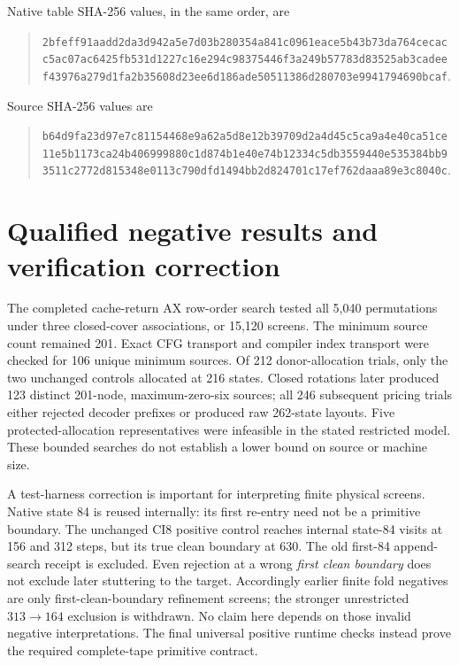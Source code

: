\documentclass[11pt]{article}
\begin{document}
Native table SHA-256 values, in the same order, are
\begin{quote}\small\ttfamily
\nolinkurl{2bfeff91aadd2da3d942a5e7d03b280354a841c0961eace5b43b73da764cecac}\\
\nolinkurl{c5ac07ac6425fb531d1227c16e294c98375446f3a249b57783d83525ab3cadee}\\
\nolinkurl{f43976a279d1fa2b35608d23ee6d186ade50511386d280703e9941794690bcaf}.
\end{quote}
Source SHA-256 values are
\begin{quote}\small\ttfamily
\nolinkurl{b64d9fa23d97e7c81154468e9a62a5d8e12b39709d2a4d45c5ca9a4e40ca51ce}\\
\nolinkurl{11e5b1173ca24b406999880c1d874b1e40e74b12334c5db3559440e535384bb9}\\
\nolinkurl{3511c2772d815348e0113c790dfd1494bb2d824701c17ef762daaa89e3c8040c}.
\end{quote}

\section{Qualified negative results and verification correction}
The completed cache-return AX row-order search tested all 5,040 permutations under three closed-cover associations, or 15,120 screens. The minimum source count remained 201. Exact CFG transport and compiler index transport were checked for 106 unique minimum sources. Of 212 donor-allocation trials, only the two unchanged controls allocated at 216 states. Closed rotations later produced 123 distinct 201-node, maximum-zero-six sources; all 246 subsequent pricing trials either rejected decoder prefixes or produced raw 262-state layouts. Five protected-allocation representatives were infeasible in the stated restricted model. These bounded searches do not establish a lower bound on source or machine size.

A test-harness correction is important for interpreting finite physical screens. Native state 84 is reused internally: its first re-entry need not be a primitive boundary. The unchanged CI8 positive control reaches internal state-84 visits at 156 and 312 steps, but its true clean boundary at 630. The old first-84 append-search receipt is excluded. Even rejection at a wrong \emph{first clean boundary} does not exclude later stuttering to the target. Accordingly earlier finite fold negatives are only first-clean-boundary refinement screens; the stronger unrestricted $313\to164$ exclusion is withdrawn. No claim here depends on those invalid negative interpretations. The final universal positive runtime checks instead prove the required complete-tape primitive contract.
\end{document}
